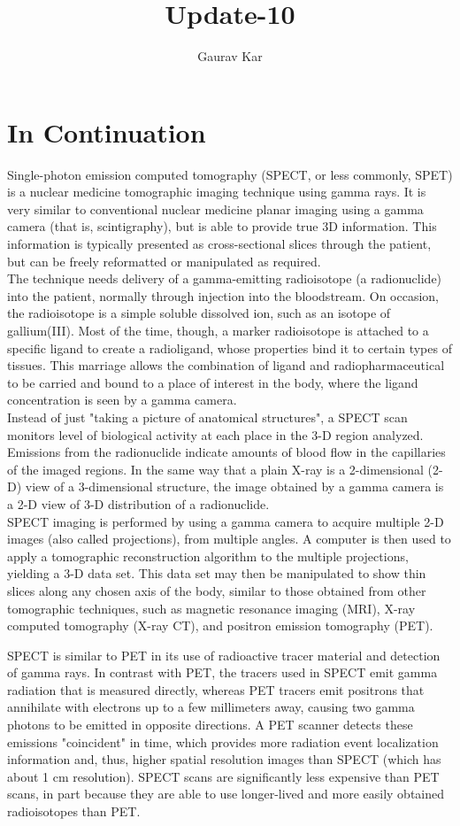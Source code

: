 \documentclass{article}
\title{Update-10}
\author{Gaurav Kar}
\date{}
\begin{document}
\maketitle

\section{In Continuation}
Single-photon emission computed tomography (SPECT, or less commonly, SPET) is a nuclear medicine tomographic imaging technique using gamma rays. It is very similar to conventional nuclear medicine planar imaging using a gamma camera (that is, scintigraphy), but is able to provide true 3D information. This information is typically presented as cross-sectional slices through the patient, but can be freely reformatted or manipulated as required.\\The technique needs delivery of a gamma-emitting radioisotope (a radionuclide) into the patient, normally through injection into the bloodstream. On occasion, the radioisotope is a simple soluble dissolved ion, such as an isotope of gallium(III). Most of the time, though, a marker radioisotope is attached to a specific ligand to create a radioligand, whose properties bind it to certain types of tissues. This marriage allows the combination of ligand and radiopharmaceutical to be carried and bound to a place of interest in the body, where the ligand concentration is seen by a gamma camera.\\Instead of just "taking a picture of anatomical structures", a SPECT scan monitors level of biological activity at each place in the 3-D region analyzed. Emissions from the radionuclide indicate amounts of blood flow in the capillaries of the imaged regions. In the same way that a plain X-ray is a 2-dimensional (2-D) view of a 3-dimensional structure, the image obtained by a gamma camera is a 2-D view of 3-D distribution of a radionuclide.\\SPECT imaging is performed by using a gamma camera to acquire multiple 2-D images (also called projections), from multiple angles. A computer is then used to apply a tomographic reconstruction algorithm to the multiple projections, yielding a 3-D data set. This data set may then be manipulated to show thin slices along any chosen axis of the body, similar to those obtained from other tomographic techniques, such as magnetic resonance imaging (MRI), X-ray computed tomography (X-ray CT), and positron emission tomography (PET).

SPECT is similar to PET in its use of radioactive tracer material and detection of gamma rays. In contrast with PET, the tracers used in SPECT emit gamma radiation that is measured directly, whereas PET tracers emit positrons that annihilate with electrons up to a few millimeters away, causing two gamma photons to be emitted in opposite directions. A PET scanner detects these emissions "coincident" in time, which provides more radiation event localization information and, thus, higher spatial resolution images than SPECT (which has about 1 cm resolution). SPECT scans are significantly less expensive than PET scans, in part because they are able to use longer-lived and more easily obtained radioisotopes than PET.
\end{document}
